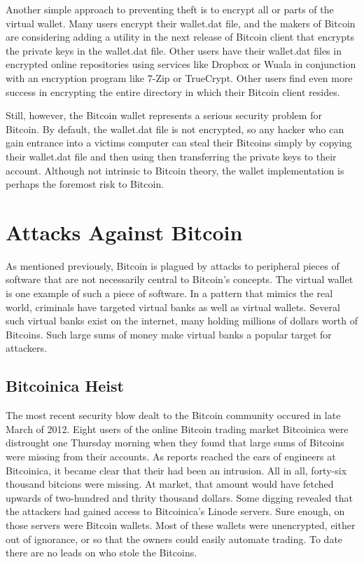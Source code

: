 \documentclass{report}
\begin{document}
Another simple approach to preventing theft is to encrypt all or parts of the virtual 
wallet.  Many users encrypt their wallet.dat file, and the makers of Bitcoin are considering 
adding a utility in the next release of Bitcoin client that encrypts the private keys 
in the wallet.dat file.  Other users have their wallet.dat files in encrypted online 
repositories using services like Dropbox or Wuala in conjunction with an encryption 
program like 7-Zip or TrueCrypt.  Other users find even more success in encrypting the 
entire directory in which their Bitcoin client resides.

Still, however, the Bitcoin wallet represents a serious security problem for Bitcoin.  
By default, the wallet.dat file is not encrypted, so any hacker who can gain entrance 
into a victims computer can steal their Bitcoins simply by copying their wallet.dat file 
and then using then transferring the private keys to their account.  Although not intrinsic 
to Bitcoin theory, the wallet implementation is perhaps the foremost risk to Bitcoin.

\section*{Attacks Against Bitcoin}
As mentioned previously, Bitcoin is plagued by attacks to peripheral pieces of software 
that are not necessarily central to Bitcoin's concepts.  The virtual wallet is one example
of such a piece of software.  In a pattern that mimics the real world, criminals have
targeted virtual banks as well as virtual wallets.  Several such virtual banks exist on
the internet, many holding millions of dollars worth of Bitcoins.  Such large sums of 
money make virtual banks a popular target for attackers.

\subsection*{Bitcoinica Heist}
The most recent security blow dealt to the Bitcoin community occured in late March of
2012\cite{Goodwin:Bitcoinica}.  Eight users of the online Bitcoin trading market Bitcoinica were distrought one
Thursday morning when they found that large sums of Bitcoins were missing from their 
accounts.  As reports reached the ears of engineers at Bitcoinica, it became clear that
their had been an intrusion.  All in all, forty-six thousand bitcions were missing.  At
market, that amount would have fetched upwards of two-hundred and thrity thousand dollars.
Some digging revealed that the attackers had gained access to Bitcoinica's Linode servers.
Sure enough, on those servers were Bitcoin wallets.  Most of these wallets were unencrypted,
either out of ignorance, or so that the owners could easily automate trading.  To date there
are no leads on who stole the Bitcoins.
\end{document}
